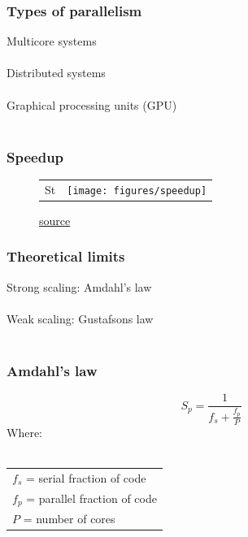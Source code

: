 \documentclass{beamer}
\begin{document}
\begin{frame}
	\frametitle{Types of parallelism}
	\begin{center}
		Multicore systems \\~\\
		
		Distributed systems \\~\\
		
		Graphical processing units (GPU) \\~\\
	\end{center}
\end{frame}

\begin{frame}
	\frametitle{Speedup}
	\begin{figure}[t]
		\begin{center}
			\begin{tabular}{ c c }
				St & \texttt{[image: figures/speedup]}	\\
			\end{tabular}
		\end{center}
		\caption{\href{https://portal.tacc.utexas.edu/c/document_library/get_file?uuid=e05d457a-0fbf-424b-87ce-c96fc0077099&groupId=13601}{source}}
	\end{figure}
\end{frame}

\begin{frame}
	\frametitle{Theoretical limits}
	\begin{center}
		Strong scaling: Amdahl's law \\~\\
		
		Weak scaling: Gustafsons law \\~\\
	\end{center}
\end{frame}

\begin{frame}
	\frametitle{Amdahl's law}
	\begin{center}
		\begin{equation*}
			S_p = \frac{1}{f_s + \frac{f_p}{P}}
		\end{equation*}
		Where: \\~\\
		\begin{tabular}{ l }
		$f_s$ = serial fraction of code \\
		$f_p$ = parallel fraction of code \\
		$P$ = number of cores \\
		\end{tabular}
	\end{center}
\end{frame}
\end{document}
